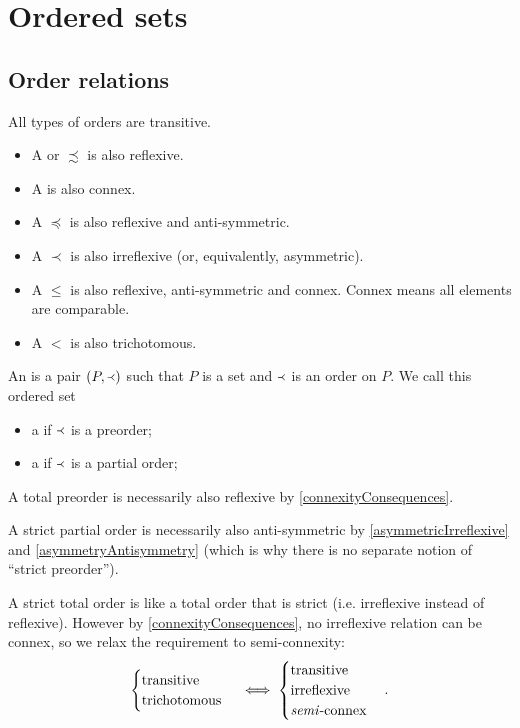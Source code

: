 \chapter{Ordered sets}
\section{Order relations}
\begin{definition}
All types of orders are transitive.
\begin{itemize}
\item A  or  $\precsim$ is also reflexive.
\item A  is also connex.
\item A  $\preceq$ is also reflexive and anti-symmetric.
\item A  $\prec$ is also irreflexive (or, equivalently, asymmetric).
\item A  $\leq$ is also reflexive, anti-symmetric and connex. Connex means all elements are comparable.
\item A  $<$ is also trichotomous.
\end{itemize}
An  is a pair $\left( P,\Yleft \right)$ such that $P$ is a set and $\Yleft$ is an order on $P$. We call this ordered set
\begin{itemize}
\item a  if $\Yleft$ is a preorder;
\item a  if $\Yleft$ is a partial order;
\end{itemize}
\end{definition}

A total preorder is necessarily also reflexive by \ref{connexityConsequences}.

A strict partial order is necessarily also anti-symmetric by \ref{asymmetricIrreflexive} and \ref{asymmetryAntisymmetry} (which is why there is no separate notion of ``strict preorder'').

A strict total order is like a total order that is strict (i.e. irreflexive instead of reflexive).  However by \ref{connexityConsequences}, no irreflexive relation can be connex, so we relax the requirement to semi-connexity:
\[ \begin{cases}
\text{transitive} \\ \text{trichotomous}
\end{cases} \iff \begin{cases}
\text{transitive} \\ \text{irreflexive} \\ \text{\textit{semi}-connex}
\end{cases}. \]

